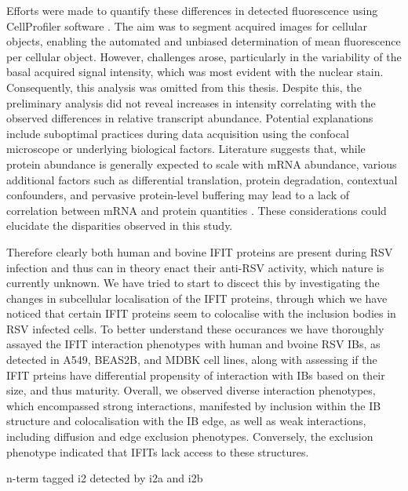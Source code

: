Efforts were made to quantify these differences in detected fluorescence using CellProfiler software \cite{McQuin2018CellProfilerBiology}. The aim was to segment acquired images for cellular objects, enabling the automated and unbiased determination of mean fluorescence per cellular object. However, challenges arose, particularly in the variability of the basal acquired signal intensity,  which was most evident with the nuclear stain. Consequently, this analysis was omitted from this thesis. Despite this, the preliminary analysis did not reveal increases in intensity correlating with the observed differences in relative transcript abundance. Potential explanations include suboptimal practices during data acquisition using the confocal microscope or underlying biological factors. Literature suggests that, while protein abundance is generally expected to scale with mRNA abundance, various additional factors such as differential translation, protein degradation, contextual confounders, and pervasive protein-level buffering may lead to a lack of correlation between mRNA and protein quantities \cite{Liu2016OnAbundance, Buccitelli2020MRNAsControl}. These considerations could elucidate the disparities observed in this study.

Therefore clearly both human and bovine IFIT proteins are present during RSV infection and thus can in theory enact their anti-RSV activity, which nature is currently unknown. We have tried to start to discect this by investigating the changes in subcellular localisation of the IFIT proteins, through which we have noticed that certain IFIT proteins seem to colocalise with the inclusion bodies in RSV infected cells. To better understand these occurances we have thoroughly assayed the IFIT interaction phenotypes with human and bvoine RSV IBs, as detected in A549, BEAS2B, and MDBK cell lines, along with assessing if the IFIT prteins have differential propensity of interaction with IBs based on their size, and thus maturity. Overall, we observed diverse interaction phenotypes, which encompassed strong interactions, manifested by inclusion within the IB structure and colocalisation with the IB edge, as well as weak interactions, including diffusion and edge exclusion phenotypes. Conversely, the exclusion phenotype indicated that IFITs lack access to these structures.




n-term tagged i2 detected by i2a and i2b

